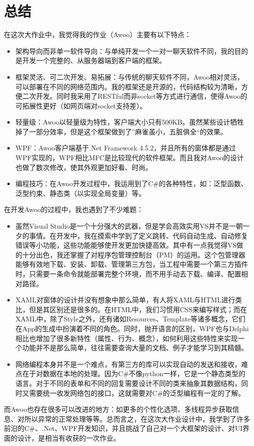 \documentclass[a4paper,11pt]{article}
\begin{document}
\section{总结}
    在这次大作业中，我觉得我的作业（Awoo）主要有以下特点：\par
    \begin{itemize}
        \item 架构导向而非单一软件导向：与单纯开发一个一对一聊天软件不同，我的目的是开发一个完整的、从服务器端到客户端的框架。
        \item 框架灵活、可二次开发、易拓展：与传统的聊天软件不同，Awoo相对灵活，可以部署在不同的网络范围内。我的框架还是开源的，代码结构较为清晰，方便二次开发。同时我采用了RESTful而非socket等方式进行通信，使得Awoo的可拓展性更好（如网页端对socket支持差）。
        \item 轻量级：Awoo以轻量级为特性，客户端大小只有500KB。虽然某些设计牺牲掉了一部分效率，但是这个框架做到了”麻雀虽小，五脏俱全“的效果。
        \item WPF：Awoo客户端基于.Net Framework 4.5.2，并且所有的窗体都是通过WPF实现的，WPF相比MFC是比较现代的软件框架。而且我对Awoo的设计也做了数次修改，使其外观更加好看、时尚。
        \item 编程技巧：在Awoo开发过程中，我运用到了C\#的各种特性，如：泛型函数、泛型约束、静态类（以实现全局变量）等。
    \end{itemize}
    在开发Awoo的过程中，我也遇到了不少难题：\par
    \begin{itemize}
        \item 虽然Visual Studio是一个十分强大的武器，但是学会高效实用VS并不是一朝一夕的事情。在开发中，我在摸索中学到了定义跳转、代码自动生成、自动修复错误等小功能，这些功能能够使开发更加快捷高效。其中有一点我觉得VS做的十分出色，我还掌握了对程序包管理控制台（PM）的运用。这个包管理器能够有效地下载、安装、卸载、管理第三方包，当工程中需要一个第三方插件时，只需要一条命令就能部署完整个环境，而不用手动去下载、编译、配置相对路径。
        \item XAML对窗体的设计并没有想象中那么简单，有人将XAML与HTML进行类比，但是其区别还是很多的。在HTML中，我们习惯用CSS来编写样式；而在XAML中，除了Style之外，还有诸如Resources、Template等诸多概念，它们在App的生成中扮演着不同的角色。同时，抛开语言的区别，WPF也与Delphi相比也增加了很多新特性（属性、行为、概念），如何利用这些特性来实现一个功能并不是那么简单，往往需要查询大量的文档、例子才能学习到其精髓。
        \item 网络编程本身并不是一个难点，有第三方的库可以实现自动的发送和接收，难点在于对数据在本地的处理。因为C\#不像python一样，它是一个静态类型的语言。对于不同的表单和不同的回复需要设计不同的类来抽象其数据结构，同时又需要统一收发网络包的接口，这就需要对C\#的泛型编程有一定的了解。
    \end{itemize}
    而Awoo也存在很多可以改进的地方：如更多的个性化选项、多线程异步获取信息、对所以异常的正常处理等等。总而言之，在这次大作业设计中，我学到了许多前沿的C\#、.Net、WPF开发知识，并且挑战了自己对一个大框架的设计、对UI界面的设计，是相当有收获的一次作业。
\end{document}
